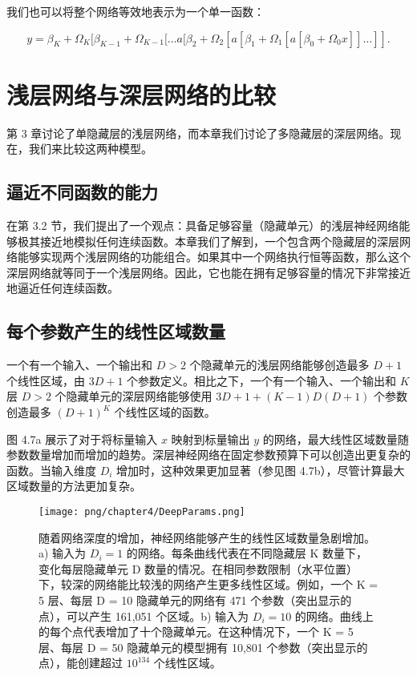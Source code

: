 我们也可以将整个网络等效地表示为一个单一函数：


\begin{equation}
y = \beta_K + \Omega_K [\beta_{K-1} + \Omega_{K-1} [ \ldots a[\beta_2 + \Omega_2 [a[\beta_1 + \Omega_1 [a[\beta_0 + \Omega_0 x]] \ldots ]]. 
\end{equation}

\section{浅层网络与深层网络的比较}
第 3 章讨论了单隐藏层的浅层网络，而本章我们讨论了多隐藏层的深层网络。现在，我们来比较这两种模型。

\subsection{逼近不同函数的能力}
在第 3.2 节，我们提出了一个观点：具备足够容量（隐藏单元）的浅层神经网络能够极其接近地模拟任何连续函数。本章我们了解到，一个包含两个隐藏层的深层网络能够实现两个浅层网络的功能组合。如果其中一个网络执行恒等函数，那么这个深层网络就等同于一个浅层网络。因此，它也能在拥有足够容量的情况下非常接近地逼近任何连续函数。

\subsection{每个参数产生的线性区域数量}
一个有一个输入、一个输出和 \(D > 2\) 个隐藏单元的浅层网络能够创造最多 \(D + 1\) 个线性区域，由 \(3D + 1\) 个参数定义。相比之下，一个有一个输入、一个输出和 \(K\) 层 \(D > 2\) 个隐藏单元的深层网络能够使用 \(3D + 1 + (K - 1)D(D + 1)\) 个参数创造最多 \((D + 1)^K\) 个线性区域的函数。

图 4.7a 展示了对于将标量输入 \(x\) 映射到标量输出 \(y\) 的网络，最大线性区域数量随参数数量增加而增加的趋势。深层神经网络在固定参数预算下可以创造出更复杂的函数。当输入维度 \(D_i\) 增加时，这种效果更加显著（参见图 4.7b），尽管计算最大区域数量的方法更加复杂。

\begin{figure}[ht!]
	\centering
	\texttt{[image: png/chapter4/DeepParams.png]}
	\caption{随着网络深度的增加，神经网络能够产生的线性区域数量急剧增加。a) 输入为 \(D_i = 1\) 的网络。每条曲线代表在不同隐藏层 K 数量下，变化每层隐藏单元 D 数量的情况。在相同参数限制（水平位置）下，较深的网络能比较浅的网络产生更多线性区域。例如，一个 K = 5 层、每层 D = 10 隐藏单元的网络有 471 个参数（突出显示的点），可以产生 161,051 个区域。b) 输入为 \(D_i = 10\) 的网络。曲线上的每个点代表增加了十个隐藏单元。在这种情况下，一个 K = 5 层、每层 D = 50 隐藏单元的模型拥有 10,801 个参数（突出显示的点），能创建超过 $10^134$ 个线性区域。}
\end{figure}

